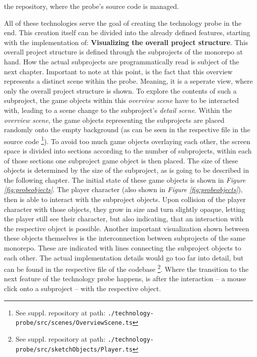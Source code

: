 the repository, where the probe's source code is managed.

All of these technologies serve the goal of creating the technology probe in the end. This creation itself can be divided into the already defined features, starting with the implementation of: \textbf{Visualizing the overall project structure}. This overall project structure is defined through the subprojects of the monorepo at hand. How the actual subprojects are programmatically read is subject of the next chapter. Important to note at this point, is the fact that this overview represents a distinct scene within the probe. Meaning, it is a seperate view, where only the overall project structure is shown. To explore the contents of such a subproject, the game objects within this \textit{overview scene} have to be interacted with, leading to a scene change to the subproject's \textit{detail scene}. Within the \textit{overview scene}, the game objects representing the subprojects are placed randomly onto the empty background (as can be seen in the respective file in the source code \footnote{See suppl. repository at path: \texttt{./technology-probe/src/scenes/OverviewScene.ts}}). To avoid too much game objects overlaying each other, the screen space is divided into sections according to the number of subprojects, within each of those sections one subproject game object is then placed. The size of these objects is determined by the size of the subproject, as is going to be described in the following chapter. The initial state of these game objects is shown in \textit{Figure \ref{fig:probeobjects}}. The player character (also shown in \textit{Figure \ref{fig:probeobjects}}), then is able to interact with the subproject objects. Upon collision of the player character with those objects, they grow in size and turn slightly opaque, letting the player still see their character, but also indicating, that an interaction with the respective object is possible. Another important visualization shown between these objects themselves is the interconnection between subprojects of the same monorepo. These are indicated with lines connecting the subproject objects to each other. The actual implementation details would go too far into detail, but can be found in the respective file of the codebase \footnote{See suppl. repository at path: \texttt{./technology-probe/src/sketchObjects/Player.ts}}. Where the transition to the next feature of the technology probe happens, is after the interaction -- a mouse click onto a subproject -- with the respective object.

